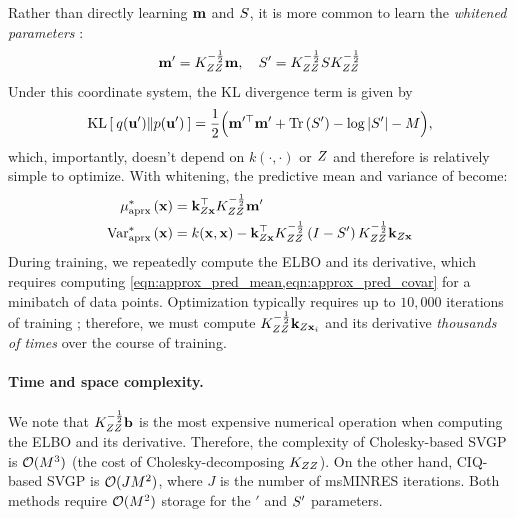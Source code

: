 Rather than directly learning $\mathbf{m}$ and $S$, it is more common to learn the \emph{whitened parameters} \cite{kuss2005assessing,matthews2017scalable}:
\[ \mathbf{m}' = K_{ZZ}^{-\frac 1 2} \mathbf{m}, \quad S' = K_{ZZ}^{-\frac 1 2} S K_{ZZ}^{-\frac 1 2} \]
Under this coordinate system, the KL divergence term is given by
%
\begin{equation}
	\kl{ q(\bu') }{ p(\bu') } = \frac{1}{2} \Bigl( \bm^{\prime \top} \bm' + \tr{ \bS' } - \log \vert \bS' \vert - M \Bigr),
	\label{eqn:kldiv_whitened}
\end{equation}
%
which, importantly, doesn't depend on $k(\cdot,\cdot)$ or $Z$ and therefore is relatively simple to optimize.
With whitening, the predictive mean and variance of become:
%
\begin{align}
  \mu^*_\text{aprx} \left( \mathbf{x} \right) &= \mathbf{k}_{Z\mathbf{x}}^\top K_{ZZ}^{-\frac 1 2} \mathbf{m}'
  \label{eqn:approx_pred_mean} \\
  \text{Var}^*_\text{aprx} \left( \mathbf{x} \right) &= k(\mathbf{x}, \mathbf{x}) -
    \mathbf{k}_{Z\mathbf{x}}^\top K_{ZZ}^{-\frac 1 2} \left( I - S' \right) K_{ZZ}^{-\frac 1 2} \mathbf{k}_{Z\mathbf{x}}
  \label{eqn:approx_pred_covar}
\end{align}
%
During training, we repeatedly compute the ELBO and its derivative, which requires computing \cref{eqn:approx_pred_mean,eqn:approx_pred_covar} for a minibatch of data points.
Optimization typically requires up to $10,\!000$ iterations of training \citep[e.g.][]{salimbeni2018natural};
therefore, we must compute $K_{ZZ}^{- \frac 1 2} \mathbf{k}_{Z \mathbf{x}_i}$ and its derivative \emph{thousands of times} over the course of training.

\paragraph{Time and space complexity.}
We note that $K_{ZZ}^{-\frac 1 2} \mathbf{b}$ is the most expensive numerical operation when computing the ELBO and its derivative.
Therefore, the complexity of Cholesky-based SVGP is $\bigo{M^3}$ (the cost of Cholesky-decomposing $K_{ZZ}$).
On the other hand, CIQ-based SVGP is $\bigo{J M^2}$, where $J$ is the number of msMINRES iterations.
Both methods require $\bigo{M^2}$ storage for the $\bm'$ and $S'$ parameters.

